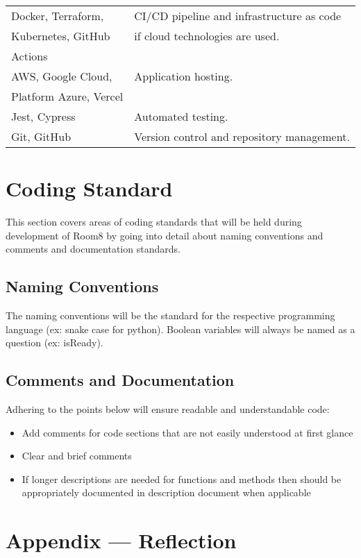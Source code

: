 \documentclass[12pt, titlepage]{article}
\begin{document}
\begin{table}[H]
\begin{tabular}{|l|l|}
\hline
Docker, Terraform, & CI/CD pipeline and infrastructure as code \\ 
Kubernetes, GitHub & if cloud technologies are used. \\ 
Actions & \\
\hline
AWS, Google Cloud, & Application hosting. \\ 
Platform Azure, Vercel & \\
\hline
Jest, Cypress & Automated testing. \\ 
\hline
Git, GitHub & Version control and repository management. \\ 
\hline
\end{tabular}
\end{table}

\section{Coding Standard}
This section covers areas of coding standards that will be held during development of Room8 by going into detail about naming conventions and comments and documentation standards.
\subsection{Naming Conventions}
The naming conventions will be the standard for the respective programming language (ex: snake case for python). Boolean variables will always be named as a question (ex: isReady).

\subsection{Comments and Documentation}
Adhering to the points below will ensure readable and understandable code:
\begin{itemize}
\item Add comments for code sections that are not easily understood at first glance
\item Clear and brief comments
\item If longer descriptions are needed for functions and methods then should be appropriately
documented in description document when applicable
\end{itemize}


\newpage{}

\section*{Appendix --- Reflection}
\end{document}
